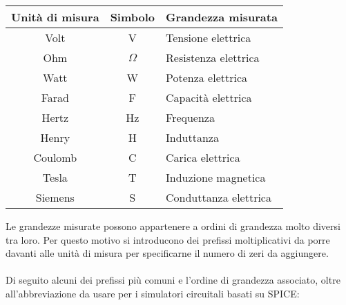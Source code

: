 \documentclass{article}
\begin{document}
\begin{center}
\begin{tabular}{|c|c|p{6cm}|}
\hline
\textbf{Unità di misura} & \textbf{Simbolo} & \textbf{Grandezza misurata} \\
\hline
Volt & V & Tensione elettrica \\
Ohm & $\Omega$ & Resistenza elettrica \\
Watt & W & Potenza elettrica \\
Farad & F & Capacità elettrica \\
Hertz & Hz & Frequenza \\
Henry & H & Induttanza \\
Coulomb & C & Carica elettrica \\
Tesla & T & Induzione magnetica \\
Siemens & S & Conduttanza elettrica \\
\hline
\end{tabular}
\end{center}
Le grandezze misurate possono appartenere a ordini di grandezza molto diversi tra loro. Per questo motivo si introducono dei prefissi moltiplicativi da porre davanti alle unità di misura per specificarne il numero di zeri da aggiungere.\\\\
Di seguito alcuni dei prefissi più comuni e l'ordine di grandezza associato, oltre all'abbreviazione da usare per i simulatori circuitali basati su SPICE:
\end{document}
